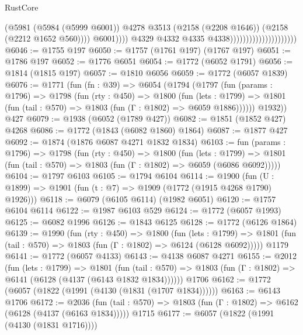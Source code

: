 \begin{lexlean}{RustCore}
\begin{coremodule}
                                                        (@5981
                                                          (@5984 (@5999 @6001))
                                                          @4278
                                                          @3513
                                                          (@2158 (@2208 @1646))
                                                          (@2158 (@2212 @1652 @560))))
                                                      @6001))))
                                              @4329
                                              @4332
                                              @4335
                                              @4338)))))))))))))))))))))
@6046 := @1755 @197
@6050 := @1757 (@1761 @197) (@1767 @197)
@6051 := @1786 @197
@6052 := @1776 @6051
@6054 := @1772 (@6052 @1791)
@6056 := @1814 (@1815 @197)
@6057 := @1810 @6056
@6059 := @1772 (@6057 @1839)
@6076 := @1771
    (fun (fn : @39) =>
    @6054
      (@1794
        (@1797
          (fun (params : @1796) =>
          @1798
            (fun (rty : @450) =>
            @1800
              (fun (lets : @1799) =>
              @1801 (fun (tail : @570) => @1803 (fun (Γ : @1802) => @6059 @1886))))))
        @1932))
    @427
@6079 := @1938 (@6052 (@1789 @427))
@6082 := @1851 (@1852 @427) @4268
@6086 := @1772 (@1843 (@6082 @1860) @1864)
@6087 := @1877 @427
@6092 := @1874 (@1876 @6087 @4271 @1832 @1834)
@6103 := fun (params : @1796) =>
  @1798
    (fun (rty : @450) =>
    @1800
      (fun (lets : @1799) =>
      @1801 (fun (tail : @570) => @1803 (fun (Γ : @1802) => @6059 (@6086 @6092)))))
@6104 := @1797 @6103
@6105 := @1794 @6104
@6114 := @1900 (fun (U : @1899) => @1901 (fun (t : @7) => @1909 (@1772 (@1915 @4268 @1790) @1926)))
@6118 := @6079 (@6105 @6114) (@1982 @6051)
@6120 := @1757 @6104 @6114
@6122 := @1987 @6103 @529
@6124 := @1772 (@6057 @1993)
@6125 := @6082 @1996
@6126 := @1843 @6125
@6128 := @1772 (@6126 @1864)
@6139 := @1990
    (fun (rty : @450) =>
    @1800
      (fun (lets : @1799) =>
      @1801 (fun (tail : @570) => @1803 (fun (Γ : @1802) => @6124 (@6128 @6092)))))
    @1179
@6141 := @1772 (@6057 @4133)
@6143 := @4138 @6087 @4271
@6155 := @2012
    (fun (lets : @1799) =>
    @1801
      (fun (tail : @570) => @1803 (fun (Γ : @1802) => @6141 (@6128 (@4137 (@6143 @1832 @1834))))))
    @1706
@6162 := @1772 (@6057 (@1822 (@1991 (@4130 (@1831 (@1707 @1834))))))
@6163 := @6143 @1706
@6172 := @2036
    (fun (tail : @570) => @1803 (fun (Γ : @1802) => @6162 (@6128 (@4137 (@6163 @1834)))))
    @1715
@6177 := @6057 (@1822 (@1991 (@4130 (@1831 @1716))))

\end{coremodule}
\end{lexlean}
